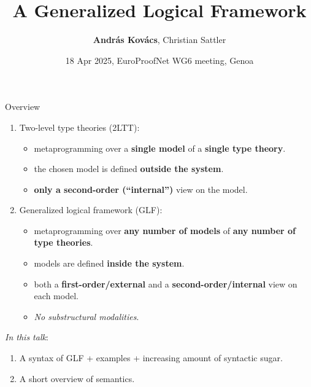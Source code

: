 \documentclass[dvipsnames,aspectratio=169]{beamer}
\title{A Generalized Logical Framework}
\author{\textbf{András Kovács\inst{1}},\,\,Christian Sattler\inst{1}}
\institute{
  \inst{1}%
       {University of Gothenburg \& Chalmers University of Technology}
}
\date{18 Apr 2025, EuroProofNet WG6 meeting, Genoa}
\begin{document}
\frame{\titlepage}

\begin{frame}{Overview}

\begin{enumerate}
\item Two-level type theories (2LTT):
  \begin{itemize}
    \item metaprogramming over a \textbf{single model} of a \textbf{single type theory}.
    \item the chosen model is defined \textbf{outside the system}.
    \item \textbf{only a second-order (``internal'')} view on the model.
  \end{itemize}
\pause
\item Generalized logical framework (GLF):
  \begin{itemize}
  \item metaprogramming over \textbf{any number of models} of \textbf{any number of type theories}.
  \item models are defined \textbf{inside the system}.
  \item both a \textbf{first-order/external} and a \textbf{second-order/internal} view on each model.
  \pause
  \item \emph{No substructural modalities}.
  \end{itemize}
\end{enumerate}
\pause
\vspace{1em}

\emph{In this talk}:
\begin{enumerate}
\item A syntax of GLF + examples + increasing amount of syntactic sugar.
\item A short overview of semantics.
\end{enumerate}

\end{frame}
\end{document}
